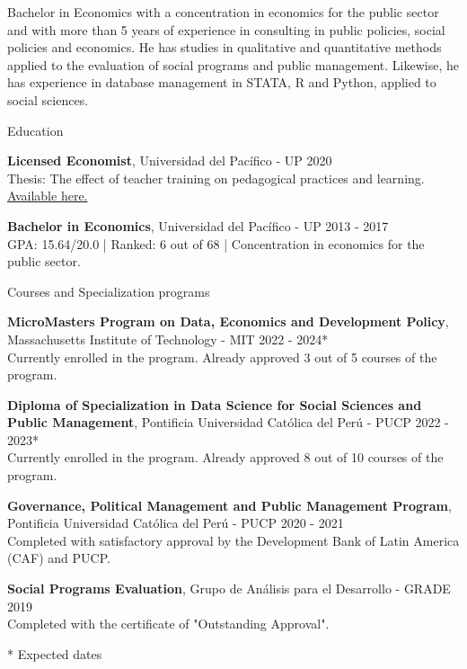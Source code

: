 \documentclass{resume} %
\begin{document}
\item {Bachelor in Economics with a concentration in economics for the public sector and with more than 5 years of experience in consulting in public policies, social policies and economics. He has studies in qualitative and quantitative methods applied to the evaluation of social programs and public management. Likewise, he has experience in database management in STATA, R and Python, applied to social sciences.}


\begin{rSection}{Education}

{\bf Licensed Economist}, Universidad del Pacífico - UP \hfill {2020} \\
Thesis: The effect of teacher training on pedagogical practices and learning. \href{https://repositorio.up.edu.pe/handle/11354/2653}{Available here.}

{\bf Bachelor in Economics}, Universidad del Pacífico - UP \hfill {2013 - 2017}\\
GPA: 15.64/20.0 | Ranked: 6 out of 68 | Concentration in economics for the public sector.

\end{rSection}


\begin{rSection}{Courses and Specialization programs}

{\bf MicroMasters Program on Data, Economics and Development Policy}, Massachusetts Institute of Technology - MIT \hfill {2022 - 2024*}\\
Currently enrolled in the program. Already approved 3 out of 5 courses of the program.

{\bf Diploma of Specialization in Data Science for Social Sciences and Public Management}, Pontificia Universidad Católica del Perú - PUCP \hfill {2022 - 2023*}\\
Currently enrolled in the program. Already approved 8 out of 10 courses of the program.

{\bf Governance, Political Management and Public Management Program}, Pontificia Universidad Católica del Perú - PUCP \hfill {2020 - 2021}\\
Completed with satisfactory approval by the Development Bank of Latin America (CAF) and PUCP. 

{\bf Social Programs Evaluation}, Grupo de Análisis para el Desarrollo - GRADE \hfill {2019}\\
Completed with the certificate of "Outstanding Approval". 

* Expected dates
\end{rSection}
\end{document}
